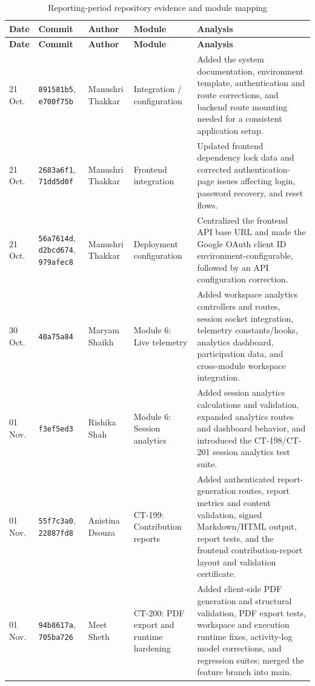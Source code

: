 \documentclass[11pt,a4paper]{article}
\begin{document}
\small
\begin{longtable}{p{1.35cm} p{2.0cm} p{2.25cm} p{2.55cm} p{7.1cm}}
\caption{Reporting-period repository evidence and module mapping}\label{tab:commit-analysis}\\
\toprule
\textbf{Date} & \textbf{Commit} & \textbf{Author} & \textbf{Module} & \textbf{Analysis} \\
\midrule
\endfirsthead
\toprule
\textbf{Date} & \textbf{Commit} & \textbf{Author} & \textbf{Module} & \textbf{Analysis} \\
\midrule
\endhead
21 Oct. & \texttt{891581b5}, \texttt{e700f75b} & Manushri Thakkar & Integration / configuration & Added the system documentation, environment template, authentication and route corrections, and backend route mounting needed for a consistent application setup. \\
21 Oct. & \texttt{2683a6f1}, \texttt{71dd5d0f} & Manushri Thakkar & Frontend integration & Updated frontend dependency lock data and corrected authentication-page issues affecting login, password recovery, and reset flows. \\
21 Oct. & \texttt{56a7614d}, \texttt{d2bcd674}, \texttt{979afec8} & Manushri Thakkar & Deployment configuration & Centralized the frontend API base URL and made the Google OAuth client ID environment-configurable, followed by an API configuration correction. \\
30 Oct. & \texttt{40a75a84} & Maryam Shaikh & Module 6: Live telemetry & Added workspace analytics controllers and routes, session socket integration, telemetry constants/hooks, analytics dashboard, participation data, and cross-module workspace integration. \\
01 Nov. & \texttt{f3ef5ed3} & Rishika Shah & Module 6: Session analytics & Added session analytics calculations and validation, expanded analytics routes and dashboard behavior, and introduced the CT-198/CT-201 session analytics test suite. \\
01 Nov. & \texttt{55f7c3a0}, \texttt{22887fd8} & Anistina Dsouza & CT-199: Contribution reports & Added authenticated report-generation routes, report metrics and content validation, signed Markdown/HTML output, report tests, and the frontend contribution-report layout and validation certificate. \\
01 Nov. & \texttt{94b8617a}, \texttt{705ba726} & Meet Sheth & CT-200: PDF export and runtime hardening & Added client-side PDF generation and structural validation, PDF export tests, workspace and execution runtime fixes, activity-log model corrections, and regression suites; merged the feature branch into main. \\
\bottomrule
\end{longtable}
\normalsize
\end{document}
